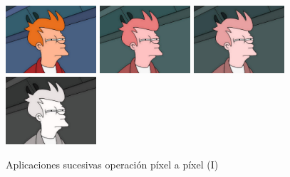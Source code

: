 \begin{figure}[H]
 \centering
 \includegraphics[width=0.3\textwidth]{imagenes/Fry.jpg}
  \includegraphics[width=0.3\textwidth]{imagenes/fryMedia1.jpg}
  \vskip0.1cm
  \includegraphics[width=0.3\textwidth]{imagenes/fryMedia2.jpg}
  \includegraphics[width=0.3\textwidth]{imagenes/fryMedia3.jpg}
 \caption{Aplicaciones sucesivas operación píxel a píxel (I)}
 \label{diseño}
 \end{figure} 

